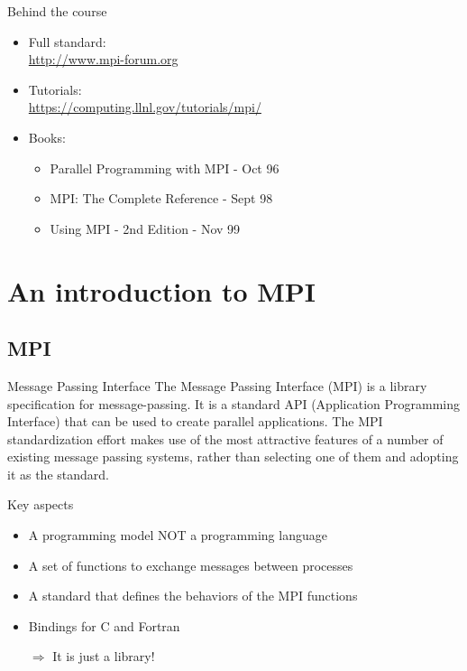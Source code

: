 \documentclass[aspectratio=43]{beamer}
\begin{document}
\begin{frame}{Behind the course}
\begin{itemize}
    \item Full standard:\\\url{http://www.mpi-forum.org}
    \item Tutorials:\\\url{https://computing.llnl.gov/tutorials/mpi/}
    \item Books:
    \begin{itemize}
        \item Parallel Programming with MPI - Oct 96
        \item MPI: The Complete Reference - Sept 98
        \item Using MPI - 2nd Edition - Nov 99

    \end{itemize}
\end{itemize}
\end{frame}


\section{An introduction to MPI}


\subsection{MPI}
\begin{frame}{Message Passing Interface}
\justifying
\small
The Message Passing Interface (MPI) is a library specification for message-passing.
It is a standard API (Application Programming Interface) that can be used to create parallel applications.
The MPI standardization effort makes use of the most attractive features of a number of existing message passing systems, rather than selecting one of them and adopting it as the standard.\\
\begin{blue2block}{Key aspects}
\begin{itemize}
    \item A programming model NOT a programming language
    \item A set of functions to exchange messages between processes
    \item A standard that defines the behaviors of the MPI functions
    \item Bindings for C and Fortran
    \item[\color{cscsred}$\Rightarrow$] It is just a library!
\end{itemize}
\end{blue2block}
\end{frame}
\end{document}
